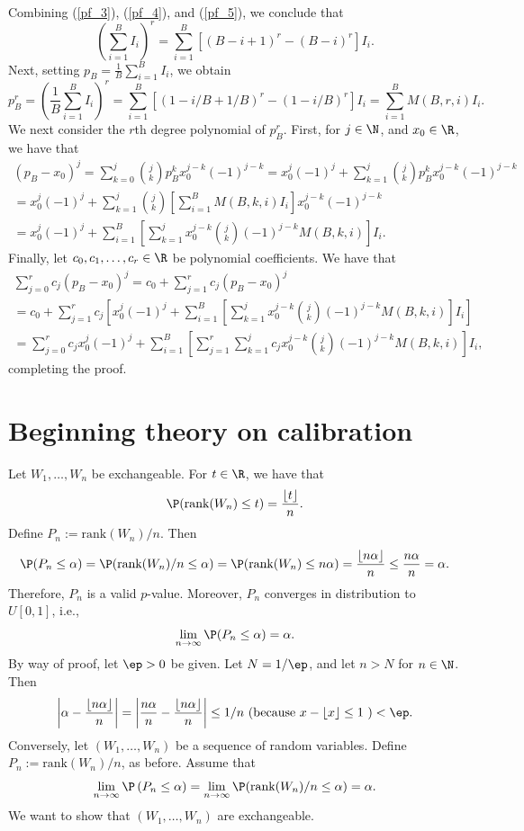 \documentclass[12pt]{article}
\begin{document}
\begin{appendices}
\begin{multline}
\end{multline}
Combining (\ref{pf_3}), (\ref{pf_4}), and (\ref{pf_5}), we conclude that
$$ \left( \sum_{i=1}^B I_i \right)^r = \sum_{i=1}^B \left[ (B - i + 1)^r - (B - i)^r \right] I_i.$$
Next, setting $p_B = \frac{1}{B} \sum_{i=1}^B I_i$, we obtain
$$p^r_B = \left( \frac{1}{B}\sum_{i=1}^B I_i \right)^r = \sum_{i=1}^B \left[ (1 - i/B + 1/B)^r - (1 - i/B)^r \right] I_i = \sum_{i=1}^B M(B,r,i) I_i.$$ We next consider the $r$th degree polynomial of $p^r_B$. First, for $j \in \N$, and $x_0 \in \R$, we have that
\begin{multline*}
\left(p_B - x_0 \right)^j = \sum_{k=0}^j \binom{j}{k} p_B^k x_0^{j-k}(-1)^{j-k} = x^j_0(-1)^j + \sum_{k=1}^j \binom{j}{k}p_B^k x_0^{j - k}(-1)^{j-k} \\ = x^j_0(-1)^j + \sum_{k=1}^j \binom{j}{k} \left[\sum_{i=1}^B M(B,k,i) I_i \right] x^{j-k}_0(-1)^{j-k} \\ = x^j_0(-1)^j + \sum_{i=1}^B  \left[ \sum_{k=1}^j x_0^{j-k} \binom{j}{k} (-1)^{j-k} M(B,k,i) \right] I_i.
\end{multline*}
Finally, let $c_0, c_1, \dots, c_r \in \R$ be polynomial coefficients. We have that
\begin{multline*}
\sum_{j=0}^r c_j \left(p_B - x_0 \right)^j  = c_0 + \sum_{j=1}^r c_j (p_B - x_0)^j \\ = c_0 + \sum_{j=1}^r c_j \left[x_0^j(-1)^j + \sum_{i=1}^B \left[\sum_{k=1}^j x_0^{j-k} \binom{j}{k}(-1)^{j-k} M(B,k,i) \right] I_i \right] \\ = \sum_{j=0}^r c_j x_0^j(-1)^j + \sum_{i=1}^B \left[\sum_{j=1}^r \sum_{k=1}^j c_j x_0^{j-k} \binom{j}{k} (-1)^{j-k} M(B,k,i) \right] I_i,
\end{multline*}
completing the proof.

\section{Beginning theory on calibration}

Let $W_1, \dots, W_n$ be exchangeable. For $t \in \R$, we have that
$$ \P( \textrm{rank}(W_n) \leq t) = \frac{\lfloor t \rfloor}{n}.$$ Define $P_n := \textrm{rank}(W_n)/n.$ Then
$$ \P( P_n \leq \alpha) = \P( \textrm{rank}(W_n)/n \leq \alpha) = \P( \textrm{rank}(W_n) \leq n\alpha ) = \frac{ \lfloor n \alpha \rfloor }{ n } \leq \frac{n\alpha}{n} = \alpha.$$ Therefore, $P_n$ is a valid $p$-value. Moreover, $P_n$ converges in distribution to $U[0,1]$, i.e.,
$$ \lim_{n \to \infty} \P(P_n \leq \alpha) = \alpha.$$ By way of proof, let $\ep > 0$ be given. Let $N = 1/\ep$, and let $n > N$ for $n \in \N$. Then
$$
\left| \alpha - \frac{ \lfloor n \alpha \rfloor }{ n } \right| = \left| \frac{n\alpha}{n} - \frac{ \lfloor n \alpha \rfloor }{ n } \right| \leq 1/n \textrm{ (because $x - \lfloor x \rfloor \leq 1$ )} < \ep.
$$
Conversely, let $(W_1, \dots, W_n)$ be a sequence of random variables. Define $P_n := \textrm{rank}(W_n)/n$, as before. Assume that
$$ \lim_{n \to \infty} \P\left( P_n \leq \alpha \right) = \lim_{n\to\infty}\P(\textrm{rank}(W_n)/n \leq \alpha) = \alpha.$$ We want to show that $(W_1, \dots, W_n)$ are exchangeable.


\end{appendices}
\end{document}
